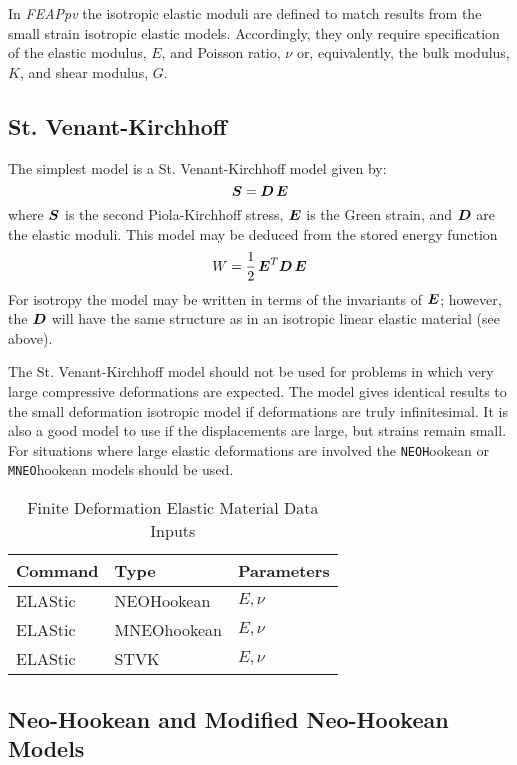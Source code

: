 In {\sl FEAPpv} the isotropic elastic moduli are defined to match results from
the small strain isotropic elastic models. Accordingly, they only
require specification of
the elastic modulus, $E$, and Poisson ratio, $\nu$ or, equivalently, the
bulk modulus, $K$, and shear modulus, $G$.

\subsection{St. Venant-Kirchhoff}

The simplest model is a St. Venant-Kirchhoff model given by:
\begin{equation}
\boldsymbol{S} = \boldsymbol{D} \, \boldsymbol{E}
\end{equation}
where $\boldsymbol{S}$ is the second Piola-Kirchhoff stress, $\boldsymbol{E}$ is the Green
strain, and $\boldsymbol{D}$ are the elastic moduli.
This model may be deduced from the stored energy function
\begin{equation}
W = \frac{1}{2} \, \boldsymbol{E}^T \boldsymbol{D} \, \boldsymbol{E}
\end{equation}
For isotropy the model may be written in terms of the invariants of $\boldsymbol{E}$;
however, the $\boldsymbol{D}$ will have the same structure as in an isotropic linear
elastic material (see above).

The St. Venant-Kirchhoff model should not be used
for problems
in which very large compressive deformations are expected.  The model gives
identical results to the small deformation isotropic model if deformations
are truly infinitesimal.  It is also a good model to use if the displacements
are large, but strains remain small.  For situations where large elastic
deformations are involved the {\tt NEOH}ookean or {\tt MNEO}hookean
models should be used.

\begin{table}[ht!]
\begin{center}
\begin{tabular}{| l | l | l |} \hline
Command & Type & Parameters \\ \hline
ELAStic & NEOHookean & $E, \nu$ \\
ELAStic & MNEOhookean & $E, \nu$ \\
ELAStic & STVK & $E, \nu$ \\ \hline
\end{tabular}
\end{center}
\caption{Finite Deformation Elastic Material Data Inputs}
\label{tab131c}
\end{table}

\subsection{Neo-Hookean and Modified Neo-Hookean Models}

